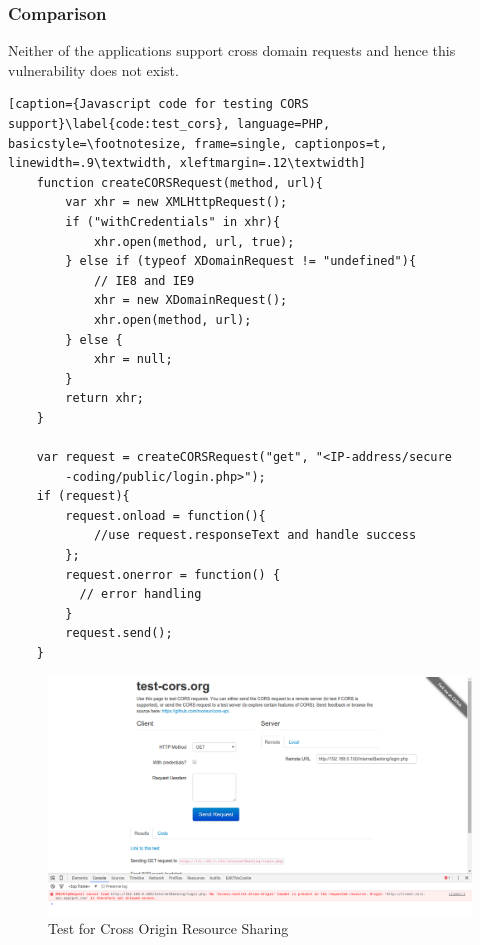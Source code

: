 \subsubsection{Comparison}
Neither of the applications support cross domain requests and hence this vulnerability does not exist.

\begin{lstlisting}[caption={Javascript code for testing CORS support}\label{code:test_cors}, language=PHP, basicstyle=\footnotesize, frame=single, captionpos=t, linewidth=.9\textwidth, xleftmargin=.12\textwidth]
    function createCORSRequest(method, url){
        var xhr = new XMLHttpRequest();
        if ("withCredentials" in xhr){
            xhr.open(method, url, true);
        } else if (typeof XDomainRequest != "undefined"){
            // IE8 and IE9
            xhr = new XDomainRequest();
            xhr.open(method, url);
        } else {
            xhr = null;
        }
        return xhr;
    }

    var request = createCORSRequest("get", "<IP-address/secure
        -coding/public/login.php>");
    if (request){
        request.onload = function(){
            //use request.responseText and handle success
        };
        request.onerror = function() {
          // error handling
        }
        request.send();
    }
\end{lstlisting}


\begin{figure}[ht]
	\centering
		\includegraphics[width=.8\linewidth]{figures/OTG-CLIENT-007.png}
		\caption{Test for Cross Origin Resource Sharing}
	\label{fig:test_cors}
\end{figure}

\clearpage